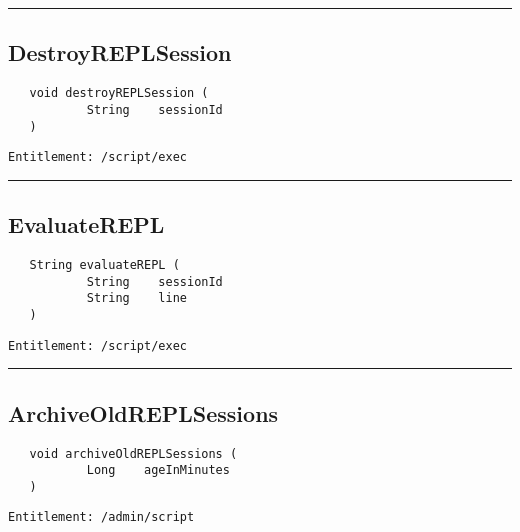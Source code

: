 \rule{12cm}{2pt}
\subsection{DestroyREPLSession}
\label{Api:DestroyREPLSession}
\begin{Verbatim}
   void destroyREPLSession (
           String    sessionId
   )
\end{Verbatim}
\begin{Verbatim}[formatcom=\color{Maroon}]
  Entitlement: /script/exec
\end{Verbatim}



\rule{12cm}{2pt}
\subsection{EvaluateREPL}
\label{Api:EvaluateREPL}
\begin{Verbatim}
   String evaluateREPL (
           String    sessionId
           String    line
   )
\end{Verbatim}
\begin{Verbatim}[formatcom=\color{Maroon}]
  Entitlement: /script/exec
\end{Verbatim}



\rule{12cm}{2pt}
\subsection{ArchiveOldREPLSessions}
\label{Api:ArchiveOldREPLSessions}
\begin{Verbatim}
   void archiveOldREPLSessions (
           Long    ageInMinutes
   )
\end{Verbatim}
\begin{Verbatim}[formatcom=\color{Maroon}]
  Entitlement: /admin/script
\end{Verbatim}



